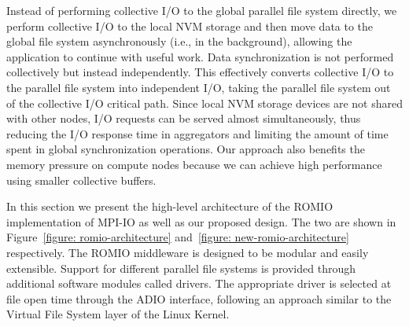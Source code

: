 Instead of performing collective I/O to the global parallel file system directly, we perform collective I/O to the local NVM storage and then move data to the global file system asynchronously 
(i.e., in the background), allowing the application to continue with useful work. Data synchronization is not performed collectively but instead independently. This effectively converts collective 
I/O to the parallel file system into independent I/O, taking the parallel file system out of the collective I/O critical path. Since local NVM storage devices are not shared with other nodes, I/O 
requests can be served almost simultaneously, thus reducing the I/O response time in aggregators and limiting the amount of time spent in global synchronization operations. Our approach also benefits 
the memory pressure on compute nodes because we can achieve high performance using smaller collective buffers.

In this section we present the high-level architecture of the ROMIO implementation of MPI-IO as well as our proposed design. The two are shown in Figure~\ref{figure: romio-architecture} 
and~\ref{figure: new-romio-architecture} respectively. The ROMIO middleware is designed to be modular and easily extensible. Support for different parallel file systems is provided through 
additional software modules called drivers. The appropriate driver is selected at file open time through the ADIO interface, following an approach similar to the Virtual File System layer 
of the Linux Kernel.

